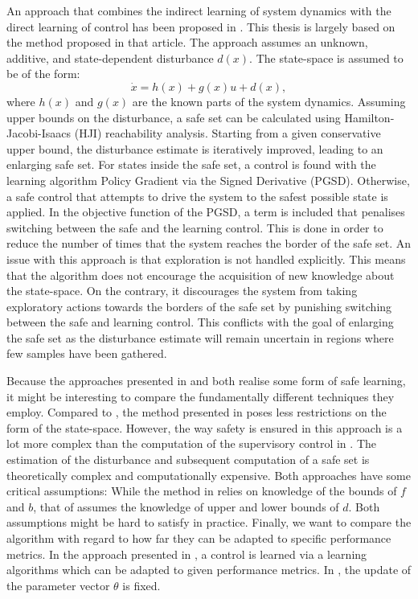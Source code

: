 \documentclass[../main.tex]{subfiles}
\begin{document}
An approach that combines the indirect learning of system dynamics with the direct learning of control has been proposed in \cite{akametalu2014reachability}. This thesis is largely based on the method proposed in that article. The approach assumes an unknown, additive, and state-dependent disturbance $d(x)$. The state-space is assumed to be of the form:
\begin{equation}
    \dot{x} = h(x)+g(x)u+d(x),
\end{equation}
where $h(x)$ and $g(x)$ are the known parts of the system dynamics.
Assuming upper bounds on the disturbance, a safe set can be calculated using Hamilton-Jacobi-Isaacs (HJI) reachability analysis. Starting from a given conservative upper bound, the disturbance estimate is iteratively improved, leading to an enlarging safe set. For states inside the safe set, a control is found with the learning algorithm Policy Gradient via the Signed Derivative (PGSD). Otherwise, a safe control that attempts to drive the system to the safest possible state is applied. In the objective function of the PGSD, a term is included that penalises switching between the safe and the learning control. This is done in order to reduce the number of times that the system reaches the border of the safe set. An issue with this approach is that exploration is not handled explicitly. This means that the algorithm does not encourage the acquisition of new knowledge about the state-space. On the contrary, it discourages the system from taking exploratory actions towards the borders of the safe set by punishing switching between the safe and learning control. This conflicts with the goal of enlarging the safe set as the disturbance estimate will remain uncertain in regions where few samples have been gathered. \par

Because the approaches presented in \cite{akametalu2014reachability} and \cite{wang1993stable} both realise some form of safe learning, it might be interesting to compare the fundamentally different techniques they employ.  Compared to \cite{wang1993stable}, the method presented in \cite{akametalu2014reachability} poses less restrictions on the form of the state-space. However, the way safety is ensured in this approach is a lot more complex than the computation of the supervisory control in \cite{wang1993stable}. The estimation of the disturbance and subsequent computation of a safe set is theoretically complex and computationally expensive. Both approaches have some critical assumptions: While the method in \cite{wang1993stable} relies on knowledge of the bounds of $f$ and $b$, that of \cite{akametalu2014reachability} assumes the knowledge of upper and lower bounds of $d$. Both assumptions might be hard to satisfy in practice. Finally, we want to compare the algorithm with regard to how far they can be adapted to specific performance metrics. In the approach presented in \cite{akametalu2014reachability}, a control is learned via a learning algorithms which can be adapted to given performance metrics. In \cite{wang1993stable}, the update of the parameter vector $\theta$ is fixed.
\end{document}
